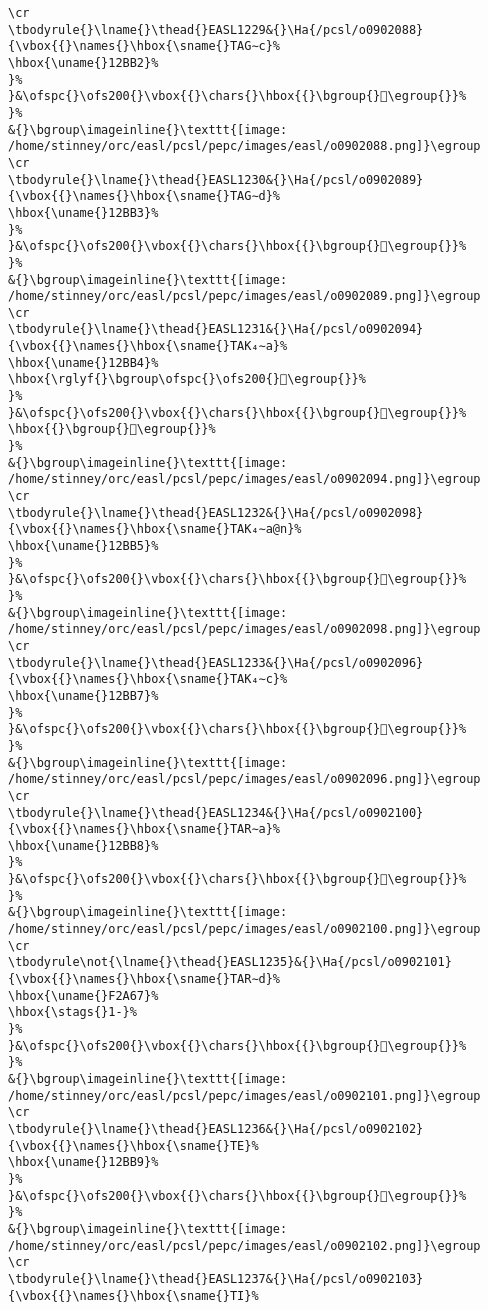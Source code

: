 \begin{verbatim}
\cr
\tbodyrule{}\lname{}\thead{}EASL1229&{}\Ha{/pcsl/o0902088}{\vbox{{}\names{}\hbox{\sname{}TAG∼c}%
\hbox{\uname{}12BB2}%
}%
}&\ofspc{}\ofs200{}\vbox{{}\chars{}\hbox{{}\bgroup{}𒮲\egroup{}}%
}%
&{}\bgroup\imageinline{}\texttt{[image: /home/stinney/orc/easl/pcsl/pepc/images/easl/o0902088.png]}\egroup
\cr
\tbodyrule{}\lname{}\thead{}EASL1230&{}\Ha{/pcsl/o0902089}{\vbox{{}\names{}\hbox{\sname{}TAG∼d}%
\hbox{\uname{}12BB3}%
}%
}&\ofspc{}\ofs200{}\vbox{{}\chars{}\hbox{{}\bgroup{}𒮳\egroup{}}%
}%
&{}\bgroup\imageinline{}\texttt{[image: /home/stinney/orc/easl/pcsl/pepc/images/easl/o0902089.png]}\egroup
\cr
\tbodyrule{}\lname{}\thead{}EASL1231&{}\Ha{/pcsl/o0902094}{\vbox{{}\names{}\hbox{\sname{}TAK₄∼a}%
\hbox{\uname{}12BB4}%
\hbox{\rglyf{}\bgroup\ofspc{}\ofs200{}𒮴\egroup{}}%
}%
}&\ofspc{}\ofs200{}\vbox{{}\chars{}\hbox{{}\bgroup{}𒮶\egroup{}}%
\hbox{{}\bgroup{}𒮴\egroup{}}%
}%
&{}\bgroup\imageinline{}\texttt{[image: /home/stinney/orc/easl/pcsl/pepc/images/easl/o0902094.png]}\egroup
\cr
\tbodyrule{}\lname{}\thead{}EASL1232&{}\Ha{/pcsl/o0902098}{\vbox{{}\names{}\hbox{\sname{}TAK₄∼a@n}%
\hbox{\uname{}12BB5}%
}%
}&\ofspc{}\ofs200{}\vbox{{}\chars{}\hbox{{}\bgroup{}𒮵\egroup{}}%
}%
&{}\bgroup\imageinline{}\texttt{[image: /home/stinney/orc/easl/pcsl/pepc/images/easl/o0902098.png]}\egroup
\cr
\tbodyrule{}\lname{}\thead{}EASL1233&{}\Ha{/pcsl/o0902096}{\vbox{{}\names{}\hbox{\sname{}TAK₄∼c}%
\hbox{\uname{}12BB7}%
}%
}&\ofspc{}\ofs200{}\vbox{{}\chars{}\hbox{{}\bgroup{}𒮷\egroup{}}%
}%
&{}\bgroup\imageinline{}\texttt{[image: /home/stinney/orc/easl/pcsl/pepc/images/easl/o0902096.png]}\egroup
\cr
\tbodyrule{}\lname{}\thead{}EASL1234&{}\Ha{/pcsl/o0902100}{\vbox{{}\names{}\hbox{\sname{}TAR∼a}%
\hbox{\uname{}12BB8}%
}%
}&\ofspc{}\ofs200{}\vbox{{}\chars{}\hbox{{}\bgroup{}𒮸\egroup{}}%
}%
&{}\bgroup\imageinline{}\texttt{[image: /home/stinney/orc/easl/pcsl/pepc/images/easl/o0902100.png]}\egroup
\cr
\tbodyrule\not{\lname{}\thead{}EASL1235}&{}\Ha{/pcsl/o0902101}{\vbox{{}\names{}\hbox{\sname{}TAR∼d}%
\hbox{\uname{}F2A67}%
\hbox{\stags{}1-}%
}%
}&\ofspc{}\ofs200{}\vbox{{}\chars{}\hbox{{}\bgroup{}󲩧\egroup{}}%
}%
&{}\bgroup\imageinline{}\texttt{[image: /home/stinney/orc/easl/pcsl/pepc/images/easl/o0902101.png]}\egroup
\cr
\tbodyrule{}\lname{}\thead{}EASL1236&{}\Ha{/pcsl/o0902102}{\vbox{{}\names{}\hbox{\sname{}TE}%
\hbox{\uname{}12BB9}%
}%
}&\ofspc{}\ofs200{}\vbox{{}\chars{}\hbox{{}\bgroup{}𒮹\egroup{}}%
}%
&{}\bgroup\imageinline{}\texttt{[image: /home/stinney/orc/easl/pcsl/pepc/images/easl/o0902102.png]}\egroup
\cr
\tbodyrule{}\lname{}\thead{}EASL1237&{}\Ha{/pcsl/o0902103}{\vbox{{}\names{}\hbox{\sname{}TI}%

\end{verbatim}

